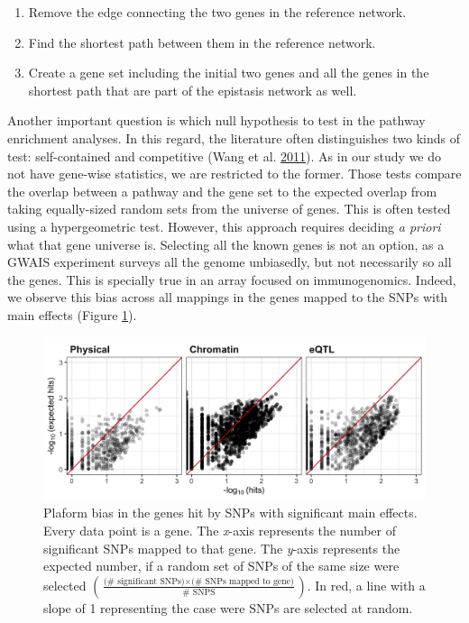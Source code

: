 \documentclass[
  11pt,
]{env/yjiao}
\providecommand{\tightlist}{%
  \setlength{\itemsep}{0pt}\setlength{\parskip}{0pt}}
\begin{document}
\begin{enumerate}
\def\labelenumi{\arabic{enumi}.}
\tightlist
\item
  Remove the edge connecting the two genes in the reference network.
\item
  Find the shortest path between them in the reference network.
\item
  Create a gene set including the initial two genes and all the genes in the
  shortest path that are part of the epistasis network as well.
\end{enumerate}

Another important question is which null hypothesis
to test in the pathway enrichment analyses.
In this regard, the literature often distinguishes two kinds of test:
self-contained and competitive (Wang et al. \protect\hyperlink{ref-wang_gene_2011}{2011}). As in our study we do not
have gene-wise statistics, we are restricted to the former.
Those tests compare the overlap between a pathway and the gene set to
the expected overlap from taking equally-sized random sets from the universe
of genes. This is often tested using a hypergeometric test. However, this
approach requires deciding \emph{a priori} what that gene universe is. Selecting
all the known genes is not an option, as a GWAIS experiment surveys all the
genome unbiasedly, but not necessarily so all the genes. This is specially true
in an array focused on immunogenomics. Indeed, we observe this bias across all
mappings in the genes mapped to the SNPs with main effects
(Figure \ref{fig:platform-bias}).



\begin{figure}
\centering
\includegraphics{fig/main_effect_bias.png}
\caption{\label{fig:platform-bias}Plaform bias in the genes hit by SNPs with significant main effects. Every data point is a gene. The \emph{x}-axis represents the number of significant SNPs mapped to that gene. The \emph{y}-axis represents the expected number, if a random set of SNPs of the same size were selected \(\left( \frac {\text{(# significant SNPs)} \times \text{(# SNPs mapped to gene)}} {\text{# SNPS}} \right)\). In red, a line with a slope of 1 representing the case were SNPs are selected at random.}
\end{figure}
\end{document}
